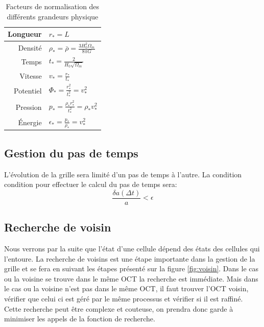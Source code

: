 \begin{table}[htbp]
\begin{center}
\begin{tabular}{r l} \hline 
Longueur  & $r_*=L$\\ \hline 
Densité & $\rho_* = \bar{\rho} = \frac{3H_0^2 \Omega_m}{8\pi G}$\\ \hline 
Temps & $t_* = \frac{2}{H_0 \sqrt{\Omega_m}}$\\ \hline 
Vitesse & $v_* = \frac{r_*}{t_*}$\\ \hline 
Potentiel & $\Phi_* = \frac{r_*^2}{t_*^2} = v_*^2$\\ \hline 
Pression & $p_* = \frac{\rho_* r_*^2}{t_*^2} = \rho_* v_*^2$\\ \hline 
Énergie & $\epsilon_* = \frac{p_*}{\rho_*} = v_*^2$\\ \hline 
\end{tabular} 
\end{center}
\caption[Facteurs de normalisation]{Facteurs de normalisation des différents grandeurs physique} 
\end{table}

\subsection{Gestion du pas de temps}
L'évolution de la grille sera limité d'un pas de temps à l'autre.
La condition condition pour effectuer le calcul du pas de temps sera:
\begin{equation}
\frac{\delta a (\Delta t) } {a} < \epsilon
\end{equation}

\subsection{Recherche de voisin}
Nous verrons par la suite que l'état d'une cellule dépend des états des cellules qui l'entoure.
La recherche de voisins est une étape importante dans la gestion de la grille et se fera en suivant les étapes présenté sur la figure \ref{fig:voisin}.
Dans le cas ou la voisine se trouve dans le même OCT la recherche est immédiate.
Mais dans le cas ou la voisine n'est pas dans le même OCT, il faut trouver l'OCT voisin, vérifier que celui ci est géré par le même processus et vérifier si il est raffiné.
Cette recherche peut être complexe et couteuse, on prendra donc garde à minimiser les appels de la fonction de recherche. 

